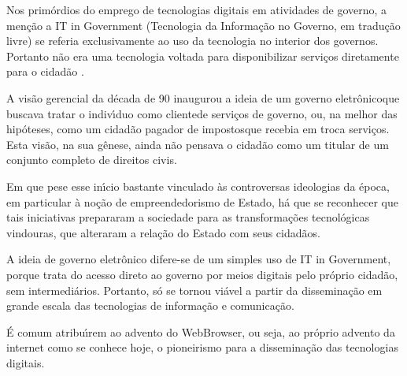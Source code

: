 \documentclass[
12pt,		%
openright,	%
twoside,  %
a4paper,			%
chapter=TITLE,		%
english,			%
french,				%
spanish,			%
brazil				%
]{USPSC-classe/USPSC}
\begin{document}
Nos prim\'ordios do emprego de tecnologias digitais em atividades de governo, a men\c{c}\~ao a \textquotedbl IT in Government (\textquotedbl Tecnologia da Informa\c{c}\~ao no Governo, em tradu\c{c}\~ao livre) se referia exclusivamente ao uso da tecnologia no interior dos governos. Portanto n\~ao era uma tecnologia voltada para disponibilizar servi\c{c}os diretamente para o cidad\~ao .









A vis\~ao gerencial da d\'ecada de 90 inaugurou a ideia de um \textquotedbl governo eletr\^onico\textquotedbl  que buscava tratar o indiv\'{\i}duo como \textquotedbl cliente\textquotedbl  de servi\c{c}os de governo, ou, na melhor das hip\'oteses, como um cidad\~ao \textquotedbl pagador de impostos\textquotedbl  que recebia em troca servi\c{c}os. Esta vis\~ao, na sua g\^enese, ainda n\~ao pensava o cidad\~ao como um titular de um conjunto completo de direitos civis.









Em que pese esse in\'{\i}cio bastante vinculado \`as controversas ideologias da \'epoca, em particular \`a no\c{c}\~ao de \textquotedbl empreendedorismo de Estado\textquotedbl , h\'a que se reconhecer que tais iniciativas prepararam a sociedade para as transforma\c{c}\~oes tecnol\'ogicas vindouras, que alteraram a rela\c{c}\~ao do Estado com seus cidad\~aos.









A ideia de governo eletr\^onico difere-se de um simples uso de \textquotedbl IT in Government\textquotedbl , porque trata do acesso direto ao governo por meios digitais pelo pr\'oprio cidad\~ao, sem intermedi\'arios. Portanto, s\'o se tornou vi\'avel a partir da dissemina\c{c}\~ao em grande escala das tecnologias de informa\c{c}\~ao e comunica\c{c}\~ao.









\'E comum atribu\'{\i}rem ao advento do WebBrowser, ou seja, ao pr\'oprio advento da internet como se conhece hoje, o pioneirismo para a dissemina\c{c}\~ao das tecnologias digitais.
\end{document}
